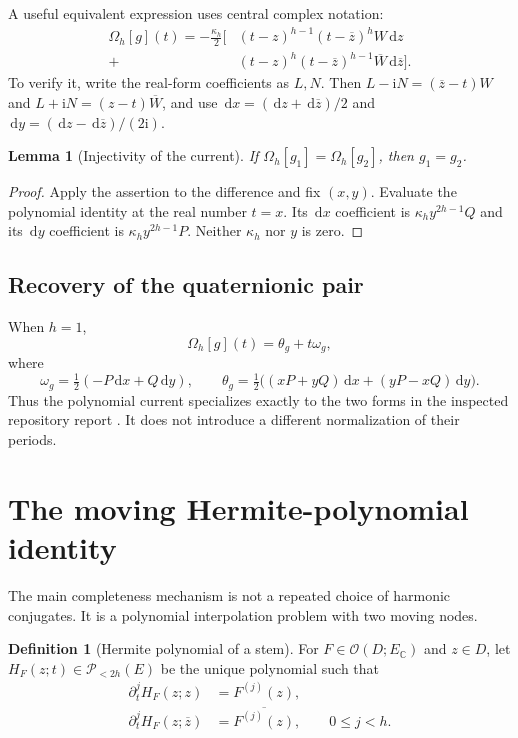 \documentclass[11pt,a4paper]{article}
\numberwithin{equation}{section}
\newtheorem{lemma}[theorem]{Lemma}
\theoremstyle{definition}
\newtheorem{definition}[theorem]{Definition}
\theoremstyle{remark}
\newcommand{\C}{\mathbb C}
\newcommand{\ii}{\mathrm i}
\newcommand{\Hol}{\mathcal O}
\newcommand{\PP}{\mathscr P_{<2h}(E)}
\newcommand{\Om}{\Omega_h}
\newcommand{\dd}{\,\mathrm d}
\newcommand{\barz}{\overline z}
\begin{document}
A useful equivalent expression uses central complex notation:
\begin{equation}\label{eq:complex-current}
\begin{split}
 \Om[g](t)=-\frac{\kappa_h}{2}\bigl[
 &(t-z)^{h-1}(t-\barz)^h W\dd z\\
 {}+{}&(t-z)^h(t-\barz)^{h-1}\overline W\dd\barz\bigr].
\end{split}
\end{equation}
To verify it, write the real-form coefficients as $L,N$. Then
$L-\ii N=(\barz-t)W$ and
$L+\ii N=(z-t)\overline W$, and use
$\dd x=(\dd z+\dd\barz)/2$ and
$\dd y=(\dd z-\dd\barz)/(2\ii)$.

\begin{lemma}[Injectivity of the current]\label{lem:current-injective}
If $\Om[g_1]=\Om[g_2]$, then $g_1=g_2$.
\end{lemma}

\begin{proof}
Apply the assertion to the difference and fix $(x,y)$. Evaluate the polynomial
identity at the real number $t=x$. Its $\dd x$ coefficient is
$\kappa_h y^{2h-1}Q$ and its $\dd y$ coefficient is
$\kappa_h y^{2h-1}P$. Neither $\kappa_h$ nor $y$ is zero.
\end{proof}

\subsection{Recovery of the quaternionic pair}

When $h=1$,
\[
 \Om[g](t)=\theta_g+t\omega_g,
\]
where
\[
 \omega_g=\tfrac12(-P\dd x+Q\dd y),\qquad
 \theta_g=\tfrac12\bigl((xP+yQ)\dd x+(yP-xQ)\dd y\bigr).
\]
Thus the polynomial current specializes exactly to the two forms in the
inspected repository report \cite{repo}. It does not introduce a different
normalization of their periods.

\section{The moving Hermite-polynomial identity}
\label{sec:hermite}

The main completeness mechanism is not a repeated choice of harmonic
conjugates. It is a polynomial interpolation problem with two moving nodes.

\begin{definition}[Hermite polynomial of a stem]\label{def:hermite}
For $F\in\Hol(D;E_{\C})$ and $z\in D$, let $H_F(z;t)\in\PP$ be the unique
polynomial such that
\begin{align}
 \partial_t^j H_F(z;z)&=F^{(j)}(z),\label{eq:hermite-jets}\\
 \partial_t^j H_F(z;\barz)&=\overline{F^{(j)}(z)},
 \qquad 0\le j<h.\nonumber
\end{align}
\end{definition}
\end{document}
